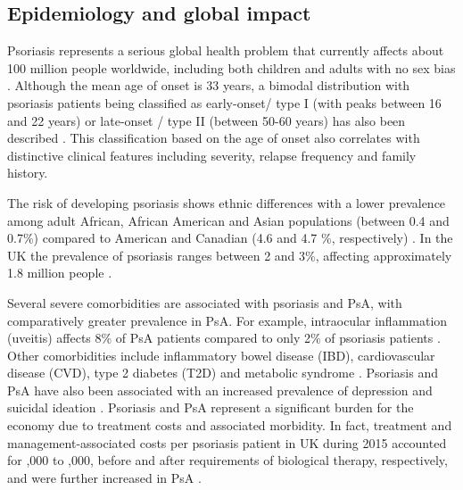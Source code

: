 \subsection{Epidemiology and global impact}
%
Psoriasis represents a serious global health problem that currently affects about 100 million people worldwide, including both children and adults with  no sex bias \parencite{Organization2016}. Although the mean age of onset is 33 years, a bimodal distribution with psoriasis patients being classified as early-onset/ type I (with peaks between 16 and 22 years) or late-onset / type II (between 50-60 years) has also been described \parencite{Henseler1985, Perera2012}. This classification based on the age of onset also correlates with distinctive clinical features including severity, relapse frequency and family history. 

The risk of developing psoriasis shows ethnic differences with a lower prevalence among adult African, African American and Asian populations (between 0.4 and 0.7\%) compared to American and Canadian (4.6 and 4.7 \%, respectively) \parencite{Jacobson2011}. In the UK the prevalence of psoriasis ranges between 2 and 3\%, affecting approximately 1.8 million people \parencite{Perera2012}. 


Several severe comorbidities are associated with psoriasis and PsA, with comparatively greater prevalence in PsA. For example, intraocular inflammation (uveitis) affects 8\% of PsA patients compared to only 2\% of psoriasis patients \parencite{Husted2011, Oliveira2015}. Other comorbidities include inflammatory bowel disease (IBD), cardiovascular disease (CVD), type 2 diabetes (T2D) and metabolic syndrome \parencite{Gelfand2006,Shapiro2007,Cohen2008}. Psoriasis and PsA have also been associated with an increased prevalence of depression and suicidal ideation \parencite{Sampogna2012}. Psoriasis and PsA represent a significant burden for the economy due to treatment costs and associated morbidity. In fact, treatment and management-associated costs per psoriasis patient in UK during 2015 accounted for ,000 to ,000, before and after requirements of biological therapy, respectively, and were further increased in PsA \parencite{Burgos-Pol2016}.




